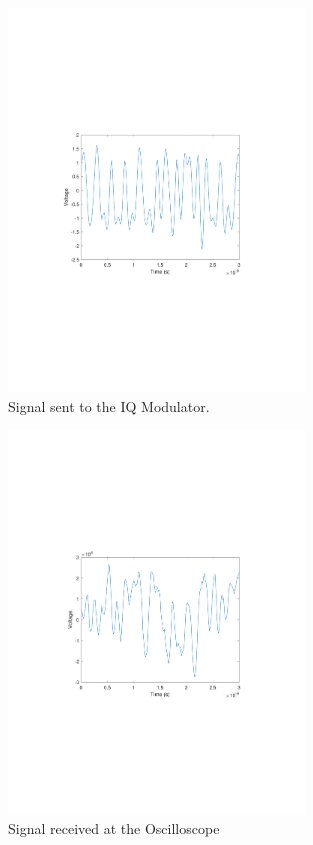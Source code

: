 \begin{figure}[H]
	\centering
	\includegraphics[clip, trim=4cm 8cm 4cm 8cm, width=0.7\textwidth]{./sdf/m_qam_system/figures/exp/TX_03.pdf}
	\caption{Signal sent to the IQ Modulator.}
	\label{fig:qamTxSig}
\end{figure}

\begin{figure}[H]
\centering
\includegraphics[clip, trim=4cm 8cm 4cm 8cm, width=0.7\textwidth]{./sdf/m_qam_system/figures/exp/RX_03.pdf}
\caption{Signal received at the Oscilloscope}
\label{fig:qamRxSig}
\end{figure}

